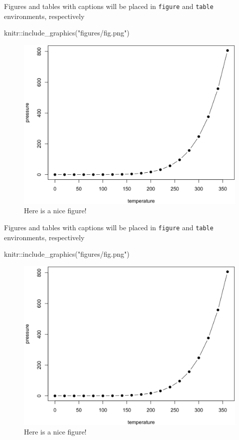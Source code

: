 \documentclass[
]{book}
\newenvironment{Shaded}{\begin{snugshade}}{\end{snugshade}}
\newcommand{\FunctionTok}[1]{\textcolor[rgb]{0.00,0.00,0.00}{#1}}
\newcommand{\NormalTok}[1]{#1}
\newcommand{\SpecialCharTok}[1]{\textcolor[rgb]{0.00,0.00,0.00}{#1}}
\newcommand{\StringTok}[1]{\textcolor[rgb]{0.31,0.60,0.02}{#1}}
\begin{document}
Figures and tables with captions will be placed in \texttt{figure} and \texttt{table} environments, respectively

\begin{Shaded}
\begin{Highlighting}[]
\NormalTok{knitr}\SpecialCharTok{::}\FunctionTok{include\_graphics}\NormalTok{(}\StringTok{"figures/fig.png"}\NormalTok{)}
\end{Highlighting}
\end{Shaded}

\begin{figure}

{\centering \includegraphics[width=0.6\linewidth]{figures/fig} 

}

\caption{Here is a nice figure!}\label{fig:nice-fig}
\end{figure}

\newpage

Figures and tables with captions will be placed in \texttt{figure} and \texttt{table} environments, respectively

\begin{Shaded}
\begin{Highlighting}[]
\NormalTok{knitr}\SpecialCharTok{::}\FunctionTok{include\_graphics}\NormalTok{(}\StringTok{"figures/fig.png"}\NormalTok{)}
\end{Highlighting}
\end{Shaded}

\begin{figure}

{\centering \includegraphics[width=0.8\linewidth]{figures/fig} 

}

\caption{Here is a nice figure!}\label{fig:unnamed-chunk-4}
\end{figure}
\end{document}
